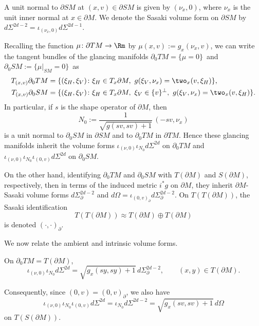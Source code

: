 A unit normal to $\partial SM$ at $(x,v) \in \partial SM$ is given by $(\nu_x,0)$, where $\nu_x$ is the unit inner normal at
$x\in \partial M$. We denote the Sasaki volume form on $\partial SM$ by $d\Sigma^{2d-2} = \iota_{(\nu_x,0)} d\Sigma^{2d-1}$.

Recalling the function $\mu\colon \partial TM\to \Rm$ by $\mu(x,v) := g_x(\nu_x, v)$, we can write the tangent bundles
of the glancing manifolds \hbox{$\partial_0 TM = \{\mu=0\}$ and $\partial_0 SM := \{\mu|_{SM} =0\}$}~as
\begin{align*}
T_{(x,v)} \partial_0 TM &= \{ (\xi_H,\xi_V)\colon \xi_H \in T_x \partial M,\ g(\xi_V, \nu_x) = \two_x(v,\xi_H) \}, \\
T_{(x,v)} \partial_0 SM &= \{ (\xi_H,\xi_V)\colon \xi_H \in T_x \partial M,\ \xi_V \in \{v\}^\perp,\ g(\xi_V, \nu_x) = \two_x(v,\xi_H) \}.
\end{align*}
In particular, if $s$ is the shape operator of $\partial M$, then
\begin{equation*}
N_0 := \frac{1}{\sqrt{g(sv,sv) + 1}}\, (-sv,\nu_x)
\end{equation*}
is a unit normal to $\partial_0 SM$ in $\partial SM$ and to $\partial_0 TM$ in $\partial TM$. Hence these glancing manifolds
inherit the volume forms $\iota_{(\nu,0)} \iota_{N_0} d\Sigma^{2d}$ on $\partial_0 TM$ and
$\iota_{(\nu,0)} \iota_{N_0} \iota_{(0,v)} d\Sigma^{2d}$ on $\partial_0 SM$.

On the other hand, identifying $\partial_0 TM$ and $\partial_0 SM$ with $T(\partial M)$ and $S(\partial M)$, respectively,
then in terms of the induced metric $i^* g$ on $\partial M$, they inherit $\partial M$-Sasaki volume forms $d\Sigma^{2d-2}_\partial$
and $d\Omega = \iota_{(0,v)_\partial} d\Sigma^{2d-2}_\partial$. On $T(T(\partial M))$, the Sasaki identification
\begin{equation*}
T(T (\partial M)) \approx T(\partial M) \oplus T(\partial M)
\end{equation*}
is denoted $(\cdot,\cdot)_\partial$.

We now relate the ambient and intrinsic volume forms.
\begin{Lemma}\label{lem:Sasakirec}
On $\partial_0 TM = T(\partial M)$,
\begin{equation*}
\iota_{(\nu,0)} \iota_{N_0} d\Sigma^{2d} = \sqrt{g_x(sy,sy) + 1}\,d\Sigma_\partial^{2d-2}, \qquad (x,y)\in T(\partial M).
\end{equation*}
\end{Lemma}
Consequently, since $(0,v) = (0,v)_\partial$, we also have
\begin{equation}
\iota_{(\nu,0)} \iota_{N_0} \iota_{(0,v)} d\Sigma^{2d} = \iota_{N_0} d\Sigma^{2d-2} = \sqrt{g_x(sv,sv)+1}\,d\Omega
\label{eq:Sasakirec2}
\end{equation}
on $T(S(\partial M))$.

